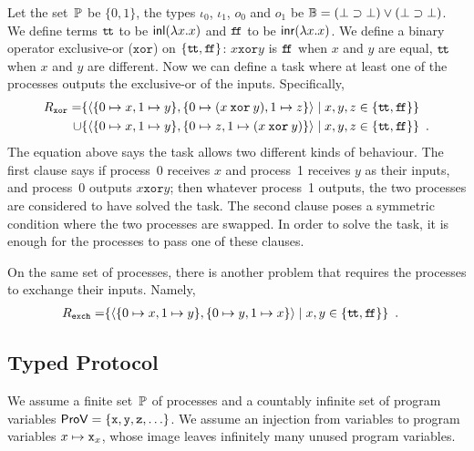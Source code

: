 {\newcommand{\true}{\texttt{t\kern -1.2pt t}}
\newcommand{\false}{\texttt{f\kern -1.7pt f}}
\newcommand{\xor}{\mathbin{\mathtt{xor}}}
 \begin{example}
  \label{ex:xor}
  Let the set~$\mathbb{P}$ be $\{0,1\}$,
  the types $\iota_0$, $\iota_1$, $o_0$ and $o_1$ be
  $\mathbb{B} = (\bot\supset\bot)\lor(\bot\supset\bot)$.
  We define terms
  $\true$ to be $\mathsf{inl}({\lambda x.x})$ and
  $\false$ to be $\mathsf{inr}({\lambda x.x})$.
  We define a binary operator exclusive-or ($\mathtt{xor}$) on
  $\{\true,\false\}$:
  $x \xor y$ is $\false$ when $x$ and $y$ are equal, $\true$ when $x$
  and $y$ are different.
  Now we can define a task where at least one of the processes outputs
  the exclusive-or of the inputs.  Specifically,
  \begin{align*}
   R_{\mathtt{xor}} =&
   \{\tuple{\{0\mapsto x, 1\mapsto y\},\{0\mapsto (x\xor y), 1\mapsto z\}}\mid
   x,y,z\in\{\true,\false\}\}
   \\ \cup & \{\tuple{\{0\mapsto x, 1\mapsto y\},\{0\mapsto z, 1\mapsto
   (x \xor y)\}}\mid
   x,y,z\in\{\true,\false\}\}\enspace.
  \end{align*}
  The equation above says the task allows two different kinds of
  behaviour.  The first clause says if process~0 receives $x$ and
  process~1 receives $y$ as their inputs, and process~0 outputs $x\xor
  y$; then whatever process~1 outputs, the two processes are considered
  to have solved the task.  The second clause poses a symmetric
  condition where the two processes are swapped.
  In order to solve the task,
  it is enough for the processes to pass one of these clauses.
 \end{example}
  \begin{example}
   On the same set of processes, there is another problem that requires
   the processes to exchange their inputs.  Namely,
  \begin{align*}
   R_{\mathtt{exch}} =&
   \{\tuple{\{0\mapsto x, 1\mapsto y\},\{0\mapsto y, 1\mapsto x\}}\mid
   x,y\in\{\true,\false\}\}\enspace.
  \end{align*}
  \end{example}

\subsection{Typed Protocol}

We assume a finite set~$\mathbb{P}$
of processes and a countably infinite
set of program variables $\mathsf{ProV} =\{\texttt{x}, \texttt{y}, \texttt{z}, \ldots\}$.
We assume an injection from variables to program variables $x\mapsto
\texttt{x}_x$, whose image leaves infinitely many unused program variables.

}
